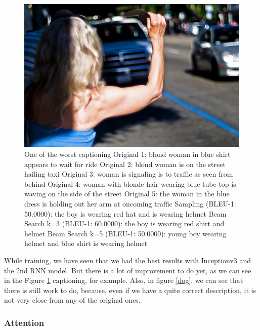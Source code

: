 \documentclass{article} %
\begin{document}
\begin{figure}[ht]
\centering
\includegraphics[scale=1]{womanstreet.jpeg}
\caption{One of the worst captioning\newline
Original 1: blond woman in blue shirt appears to wait for ride\newline
Original 2: blond woman is on the street hailing taxi\newline
Original 3: woman is signaling is to traffic as seen from behind\newline
Original 4: woman with blonde hair wearing blue tube top is waving on the side of the street\newline
Original 5: the woman in the blue dress is holding out her arm at oncoming traffic\newline
Sampling (BLEU-1: 50.0000): the boy is wearing red hat and is wearing helmet\newline
Beam Search k=3 (BLEU-1: 60.0000): the boy is wearing red shirt and helmet \newline
Beam Search k=5 (BLEU-1: 50.0000): young boy wearing helmet and blue shirt is wearing helmet}
\label{womanstreet}
\end{figure}


While training, we have seen that we had the best results with Inceptionv3 and the 2nd RNN model. But there is a lot of improvement to do yet, as we can see in the Figure \ref{womanstreet} captioning, for example. Also, in figure \ref{dog}, we can see that there is still work to do, because, even if we have a quite correct description, it is not very close from any of the original ones.

\subsubsection{Attention}
\end{document}
